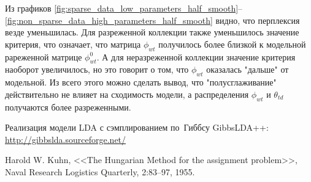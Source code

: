 \documentclass[12pt]{article}
\begin{document}
Из графиков \ref{fig:sparse_data_low_parameters_half_smooth}--\ref{fig:non_sparse_data_high_parameters_half_smooth} видно, что перплексия везде уменьшилась.
Для разреженной коллекции также уменьшилось значение критерия, что означает, что матрица $ \phi_{wt} $ получилось более близкой к модельной рареженной матрице $ \phi_{wt}^0 $.
А для неразреженной коллекции значение критерия наоборот увеличилось, но это говорит о том, что $ \phi_{wt} $ оказалась "дальше" от модельной.
Из всего этого можно сделать вывод, что "полусглаживание" действительно не влияет на сходимость модели, а распределения $ \phi_{wt} $ и $ \theta_{td} $ получаются более разреженными.

\begin{thebibliography}{0}
  Реализация модели LDA с сэмплированием по~Гиббсу GibbsLDA++: \url{http://gibbslda.sourceforge.net/}

  Harold W. Kuhn, <<The Hungarian Method for the assignment problem>>, Naval Research Logistics Quarterly, 2:83–97, 1955.
\end{thebibliography}
\end{document}

